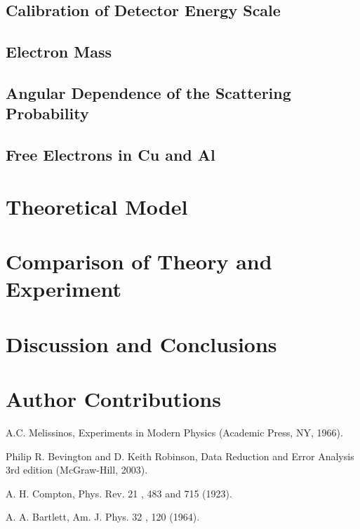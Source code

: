 \documentclass[%
 reprint,
 amsmath,amssymb,
 aps,
 pra,
]{revtex4-1}
\begin{document}
\subsection{Calibration of Detector Energy Scale}

\subsection{Electron Mass}

\subsection{Angular Dependence of the Scattering Probability}

\subsection{Free Electrons in Cu and Al}

\section{Theoretical Model}

\section{Comparison of Theory and Experiment}

\section{Discussion and Conclusions}

\section{Author Contributions}

\begin{thebibliography}{4}
	
	A.C. Melissinos, Experiments in Modern Physics (Academic Press, NY, 1966).
	
	Philip R. Bevington and D. Keith Robinson, Data Reduction and Error Analysis 3rd edition (McGraw-Hill, 2003).
	
	A. H. Compton, Phys. Rev. 21 , 483 and 715 (1923).
	
	A. A. Bartlett, Am. J. Phys. 32 , 120 (1964).

\end{thebibliography}
\end{document}
